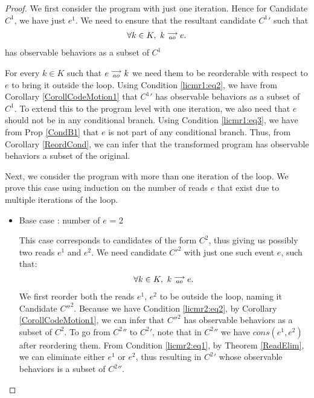 \begin{proof}

    We first consider the program with just one iteration. 
    Hence for Candidate $C^1$, we have just $e^1$. 
    We need to ensure that the resultant candidate $C^{1}'$ such that 
    \begin{align*}
        \forall k \in K, \ k\stackrel{\longrightarrow}{_{ao}}e.
    \end{align*}  
    has observable behaviors as a subset of $C^1$

    For every $k \in K$ such that $e\stackrel{\longrightarrow}{_{ao}}k$ we need them to be reorderable with respect to $e$ to bring it outside the loop.
    Using Condition \ref{licmr1:eq2}, we have from Corollary \ref{CorollCodeMotion1} that $C^{1}'$ has observable behaviors as a subset of $C^1$.
    To extend this to the program level with one iteration, we also need that $e$ should not be in any conditional branch.
    Using Condition \ref{licmr1:eq3}, we have from Prop \ref{CondB1} that $e$ is not part of any conditional branch.
    Thus, from Corollary \ref{ReordCond}, we can infer that the transformed program has observable behaviors a subset of the original.  
    
    Next, we consider the program with more than one iteration of the loop. 
    We prove this case using induction on the number of reads $e$ that exist due to multiple iterations of the loop. 
    \begin{itemize}
        
        \item Base case : number of $e$ = 2
    
        This case corresponds to candidates of the form $C^2$, thus giving us possibly two reads $e^1$ and $e^2$.
        We need candidate $C'^2$ with just one such event $e$, such that:
        \begin{align*}
            \forall k \in K, \ k\stackrel{\longrightarrow}{_{ao}}e.
        \end{align*} 
        We first reorder both the reads $e^1$, $e^2$ to be outside the loop, naming it Candidate $C''^2$.
        Because we have Condition \ref{licmr2:eq2}, by Corollary \ref{CorollCodeMotion1}, we can infer that $C''^2$ has observable behaviors as a subset of $C^2$.
        To go from $C^{2}''$ to $C^2'$, note that in $C^{2}''$ we have $cons(e^1, e^2)$ after reordering them. 
        From Condition \ref{licmr2:eq1}, by Theorem \ref{ReadElim}, we can eliminate either $e^1$ or $e^2$, thus resulting in $C^2'$ whose observable behaviors is a subset of $C^{2}''$.
        

\end{itemize}
\end{proof}
